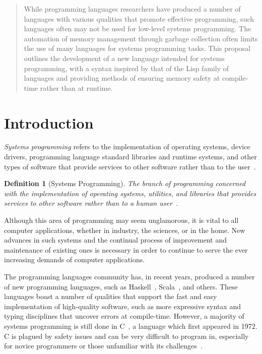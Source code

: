 \documentclass[11pt,a4paper]{article}
\theoremstyle{break}
\newtheorem{defn}{Definition}
\begin{document}
\begin{quote}
While programming languages researchers have produced a number of languages with various qualities that promote effective programming, such languages often may not be used for low-level systems programming. The automation of memory management through garbage collection often limits the use of many languages for systems programming tasks. This proposal outlines the development of a new language intended for systems programming, with a syntax inspired by that of the Lisp family of languages and providing methods of ensuring memory safety at compile-time rather than at runtime.
\end{quote}

\section{Introduction}
\label{sec:introduction}
\vspace*{-.1in}

\textit{Systems programming} refers to the implementation of operating systems, device drivers, programming language standard libraries and runtime systems, and other types of software that provide services to other software rather than to the user~\cite{Narten:2003:SP:1074100.1074850,Shapiro:2006:PLC:1215995.1216004}.

\begin{defn}[Systems Programming]
The branch of programming concerned with the implementation of operating systems, utilities, and libraries that provides services to other software rather than to a human user~\cite{Narten:2003:SP:1074100.1074850}.
\end{defn}

Although this area of programming may seem unglamorous, it is vital to all computer applications, whether in industry, the sciences, or in the home. New advances in such systems and the continual process of improvement and maintenance of existing ones is necessary in order to continue to serve the ever increasing demands of computer applications.

The programming languages community has, in recent years, produced a number of new programming languages, such as Haskell~\cite{jones2003haskell,hudak1992report}, Scala~\cite{odersky2004scala,odersky2004overview}, and others. These languages boast a number of qualities that support the fast and easy implementation of high-quality software, such as more expressive syntax and typing disciplines that uncover errors at compile-time. However, a majority of systems programming is still done in C~\cite{kernighan1988c}, a language which first appeared in 1972. C is plagued by safety issues and can be very difficult to program in, especially for novice programmers or those unfamiliar with its challenges~\cite{Shapiro:2006:PLC:1215995.1216004,Ray:2014:LSS:2635868.2635922,Bhattacharya:2011:APL:1985793.1985817}.
\end{document}
